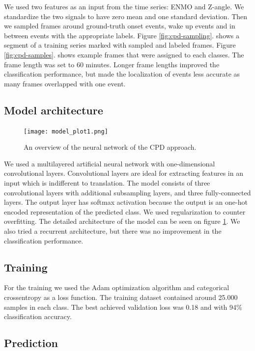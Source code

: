\documentclass{article}
\begin{document}
We used two features as an input from the time series: ENMO and Z-angle. We standardize the two signals to have zero mean and one standard deviation. Then we sampled frames around ground-truth onset events, wake up events and in between events with the appropriate labels. Figure \ref{fig:cpd-sampling}. shows a segment of a training series marked with sampled and labeled frames. Figure \ref{fig:cpd-samples}. shows example frames that were assigned to each classes. The frame length was set to 60 minutes. Longer frame lengths improved the classification performance, but made the localization of events less accurate as many frames overlapped with one event.

\subsection{Model architecture}

\begin{figure}
  \label{fig:model-cpd}
  \texttt{[image: model\_plot1.png]}
  \caption{An overview of the neural network of the CPD approach.}
\end{figure}

We used a multilayered artificial neural network with one-dimensional convolutional layers. Convolutional layers are ideal for extracting features in an input which is indifferent to translation. The model consists of three convolutional layers with additional subsampling layers, and three fully-connected layers. The output layer has softmax activation because the output is an one-hot encoded representation of the predicted class. We used regularization to counter overfitting. The detailed architecture of the model can be seen on figure \ref{fig:model-cpd}.
We also tried a recurrent architecture, but there was no improvement in the classification performance.

\subsection{Training}

For the training we used the Adam optimization algorithm and categorical crossentropy as a loss function. The training dataset contained around 25.000 samples in each class. The best achieved validation loss was 0.18 and with 94\% classification accuracy.

\subsection{Prediction}
\end{document}
